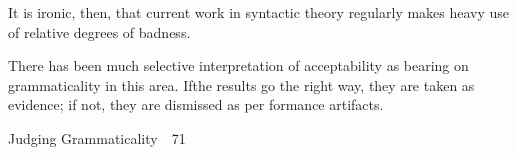 \setcounter{listWWNumlvleveli}{2}
\begin{listWWNumlvleveli}
\item 
\setcounter{listWWNumlvlevelii}{1}
\begin{listWWNumlvlevelii}
\item 
\setcounter{listWWNumlvleveliii}{0}
\begin{listWWNumlvleveliii}
\item 
\begin{styleStandard}
It is ironic, then, that current work in syntactic theory regularly makes heavy use of relative degrees of badness.
\end{styleStandard}


\item 
\begin{styleStandard}
There has been much selective interpretation of acceptability as bearing on grammaticality in this area. Ifthe results go the right way, they are taken as evidence; if not, they are dismissed as per\- formance artifacts.
\end{styleStandard}


\end{listWWNumlvleveliii}
\end{listWWNumlvlevelii}
\end{listWWNumlvleveli}
\clearpage\setcounter{page}{1}\begin{styleStandard}
Judging Grammaticality\ \ 71
\end{styleStandard}


